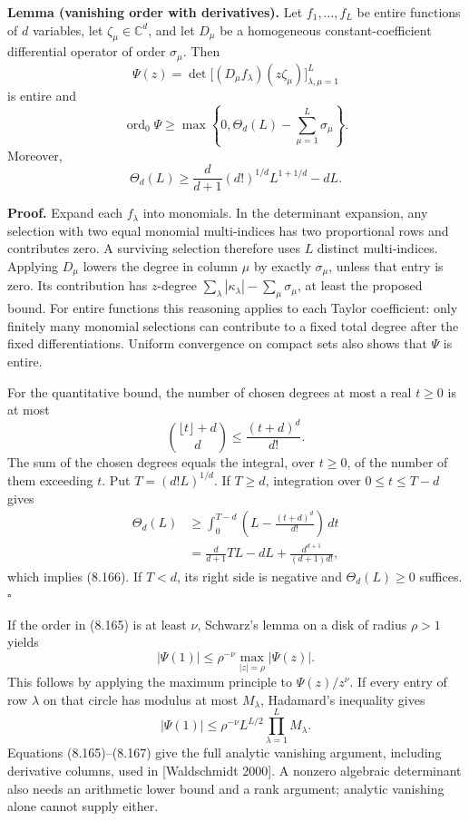 \documentclass[
  11pt,
  a4paper,
]{article}
\begin{document}
\textbf{Lemma (vanishing order with derivatives).} Let
\(f_1,\ldots,f_L\) be entire functions of \(d\) variables, let
\(\zeta_\mu\in\mathbb C^d\), and let \(D_\mu\) be a homogeneous
constant-coefficient differential operator of order \(\sigma_\mu\). Then
\[
\Psi(z)=\det\bigl[(D_\mu f_\lambda)(z\zeta_\mu)\bigr]_{\lambda,\mu=1}^L
\] is entire and \[
\operatorname{ord}_0\Psi\ge
\max\left\{0,\Theta_d(L)-\sum_{\mu=1}^L\sigma_\mu\right\}. \tag{8.165}
\] Moreover, \[
\Theta_d(L)\ge
\frac d{d+1}(d!)^{1/d}L^{1+1/d}-dL. \tag{8.166}
\]

\textbf{Proof.} Expand each \(f_\lambda\) into monomials. In the
determinant expansion, any selection with two equal monomial
multi-indices has two proportional rows and contributes zero. A
surviving selection therefore uses \(L\) distinct multi-indices.
Applying \(D_\mu\) lowers the degree in column \(\mu\) by exactly
\(\sigma_\mu\), unless that entry is zero. Its contribution has
\(z\)-degree \(\sum_\lambda|\kappa_\lambda|-\sum_\mu\sigma_\mu\), at
least the proposed bound. For entire functions this reasoning applies to
each Taylor coefficient: only finitely many monomial selections can
contribute to a fixed total degree after the fixed differentiations.
Uniform convergence on compact sets also shows that \(\Psi\) is entire.

For the quantitative bound, the number of chosen degrees at most a real
\(t\ge0\) is at most \[
\binom{\lfloor t\rfloor+d}{d}\le\frac{(t+d)^d}{d!}.
\] The sum of the chosen degrees equals the integral, over \(t\ge0\), of
the number of them exceeding \(t\). Put \(T=(d!L)^{1/d}\). If
\(T\ge d\), integration over \(0\le t\le T-d\) gives \[
\begin{aligned}
\Theta_d(L)
&\ge\int_0^{T-d}
\left(L-\frac{(t+d)^d}{d!}\right)\,dt\\
&=\frac d{d+1}TL-dL+
\frac{d^{d+1}}{(d+1)d!},
\end{aligned}
\] which implies (8.166). If \(T<d\), its right side is negative and
\(\Theta_d(L)\ge0\) suffices. \(\square\)

If the order in (8.165) is at least \(\nu\), Schwarz's lemma on a disk
of radius \(\rho>1\) yields \[
|\Psi(1)|\le\rho^{-\nu}\max_{|z|=\rho}|\Psi(z)|.
\] This follows by applying the maximum principle to \(\Psi(z)/z^\nu\).
If every entry of row \(\lambda\) on that circle has modulus at most
\(M_\lambda\), Hadamard's inequality gives \[
|\Psi(1)|\le
\rho^{-\nu}L^{L/2}\prod_{\lambda=1}^L M_\lambda. \tag{8.167}
\] Equations (8.165)--(8.167) give the full analytic vanishing argument,
including derivative columns, used in {[}Waldschmidt 2000{]}. A nonzero
algebraic determinant also needs an arithmetic lower bound and a rank
argument; analytic vanishing alone cannot supply either.
\end{document}
